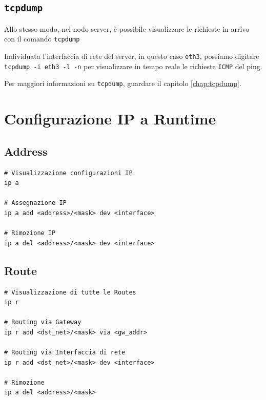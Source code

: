 \documentclass[a4paper]{report}
\newenvironment{info}{\begin{tcolorbox}[fonttitle=\sffamily\bfseries\large,title=Info,colframe=blue!75!white]}{\end{tcolorbox}}
\newenvironment{code}{\begin{tcolorbox}[size=small]}{\end{tcolorbox}}
\begin{document}
\subsection{\texttt{tcpdump}}

Allo stesso modo, nel nodo server, è possibile visualizzare le richieste in arrivo con il comando \texttt{tcpdump}

Individuata l'interfaccia di rete del server, in questo caso \texttt{eth3}, possiamo digitare \texttt{tcpdump -i eth3 -l -n} per visualizzare in tempo reale le richieste \texttt{ICMP} del ping.

\begin{info}
	Per maggiori informazioni su \texttt{tcpdump}, guardare il capitolo \ref{chap:tcpdump}.
\end{info}

\section{Configurazione IP a Runtime}

\subsection{Address}

\begin{code}
\begin{lstlisting}
# Visualizzazione configurazioni IP
ip a

# Assegnazione IP
ip a add <address>/<mask> dev <interface>

# Rimozione IP
ip a del <address>/<mask> dev <interface>
\end{lstlisting}
\end{code}

\subsection {Route}

\begin{code}
\begin{lstlisting}
# Visualizzazione di tutte le Routes
ip r

# Routing via Gateway
ip r add <dst_net>/<mask> via <gw_addr>

# Routing via Interfaccia di rete
ip r add <dst_net>/<mask> dev <interface>

# Rimozione
ip a del <address>/<mask>
\end{lstlisting}
\end{code}
\end{document}
